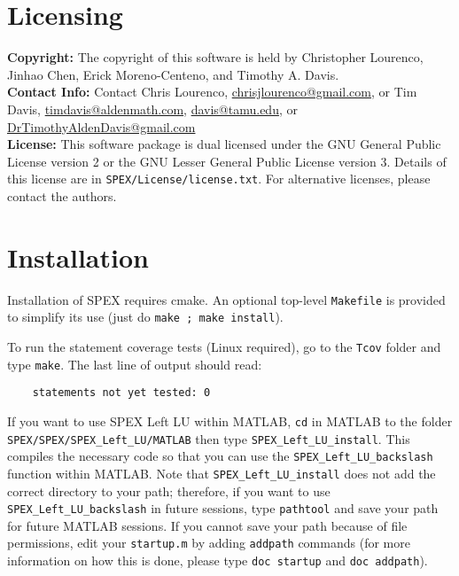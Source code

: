 \documentclass[12pt]{report}
\theoremstyle{definition}
\begin{document}
\section{Licensing} \label{s:LeftLU:licensing}

\textbf{Copyright:} The copyright of this software is held by  Christopher Lourenco, Jinhao Chen, Erick Moreno-Centeno, and Timothy A. Davis.\\

\noindent \textbf{Contact Info:} Contact Chris Lourenco,
\href{mailto:chrisjlourenco@gmail.com}{chrisjlourenco@gmail.com}, or Tim Davis,
\href{mailto:timdavis@aldenmath.com}{timdavis@aldenmath.com},
\href{mailto:davis@tamu.edu}{davis@tamu.edu}, or
\href{DrTimothyAldenDavis@gmail.com}{DrTimothyAldenDavis@gmail.com}\\

\noindent \textbf{License:} This software package is dual licensed under the GNU General Public License version 2 or the GNU Lesser General Public License version 3. Details of this license are in \verb|SPEX/License/license.txt|. For alternative licenses, please contact the authors.


\section{Installation} \label{s:install}

Installation of SPEX requires cmake.  An optional top-level \verb'Makefile'
is provided to simplify its use (just do \verb'make ; make install').

To run the statement coverage tests (Linux required), go to the \verb|Tcov| folder and
type \verb|make|.  The last line of output should read:

\begin{verbatim}
    statements not yet tested: 0
\end{verbatim}

If you want to use SPEX Left LU within MATLAB, 
\verb|cd| in MATLAB to the folder \verb|SPEX/SPEX/SPEX_Left_LU/MATLAB| then type
\newline \verb|SPEX_Left_LU_install|. This compiles the necessary code so that you can use
the \verb|SPEX_Left_LU_backslash| function within MATLAB. Note that
\newline \verb|SPEX_Left_LU_install| does not add the correct directory to your path; therefore,
if you want to use \verb|SPEX_Left_LU_backslash| in future sessions, type
\verb|pathtool| and save your path for future MATLAB sessions. If you cannot
save your path because of file permissions, edit your \verb|startup.m| by
adding \verb|addpath| commands (for more information on how this is done,
please type \verb|doc startup| and \verb|doc addpath|).
\end{document}
